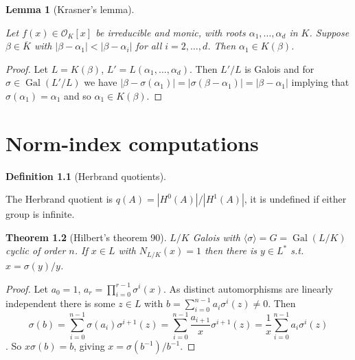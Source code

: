\documentclass[10pt,]{book}
\newcommand{\lt}{<}
\theoremstyle{plain}
\newtheorem{theorem}{Theorem}[section]
\newtheorem{lemma}[theorem]{Lemma}
\theoremstyle{definition}
\newtheorem{definition}[theorem]{Definition}
\newcommand{\cO}{\mathcal{O}}
\DeclareMathOperator{\Gal}{Gal}
\begin{document}
\begin{lemma}[Krasner's lemma]\label{lemma-14}

          Let \(f(x) \in \cO_K[x]\) be irreducible and monic, with roots \(\alpha_1,\ldots,\alpha_d\) in \(K\).
          Suppose \(\beta \in \overline{K}\) with \(|\beta-\alpha_1| \lt |\beta - \alpha_i|\) for all \(i = 2,\ldots,d\).
          Then \(\alpha_1 \in K(\beta)\).
        \end{lemma}
\begin{proof}

          Let \(L  = K(\beta)\), \(L' = L(\alpha_1,\ldots,\alpha_d)\).
          Then \(L'/L\) is Galois and for \(\sigma\in \Gal(L'/L)\) we have \(|\beta-\sigma(\alpha_1)| = |\sigma(\beta-\alpha_1)| = |\beta-\alpha_1|\) implying that \(\sigma(\alpha_1) = \alpha_1\) and so \(\alpha_1 \in K(\beta)\).
        \end{proof}
\typeout{************************************************}
\typeout{************************************************}
\chapter[Norm-index computations]{Norm-index computations}\label{chap-norm}
\begin{definition}[Herbrand quotients]\label{definition-12}

          The Herbrand quotient is \(q(A) = |H^0(A)|/|H^1(A)|\), it is undefined if either group is infinite.
        \end{definition}
\begin{theorem}[Hilbert's theorem 90]\label{theorem-10}
\(L/K\) Galois with \(\langle \sigma \rangle  = G  = \Gal(L/K)\) cyclic of order \(n\).
          If \(x\in L\) with \(N_{L/K} (x) = 1\) then there is \(y \in L^*\) s.t. \(x = \sigma(y)/y\).
        \end{theorem}
\begin{proof}

          Let \(a_0 = 1\), \(a_r = \prod_{i=0}^{r-1} \sigma^i(x)\).
          As distinct automorphisms are linearly independent there is some \(z\in L\) with \(b=\sum_{i=0}^{n-1} a_i \sigma^i(z) \ne 0\).
          Then \[\sigma(b) = \sum_{i=0}^{n-1}\sigma(a_i)\sigma^{i+1}(z) = \sum_{i=0}^{n-1}\frac{a_{i+1}}{x}\sigma^{i+1}(z) =\frac{1}{x}\sum_{i=0}^{n-1}a_i\sigma^{i}(z)\].
          So \(x\sigma(b) = b\), giving \(x = \sigma(b^{-1})/b^{-1}\).
        \end{proof}
%
\backmatter
%
\end{document}
